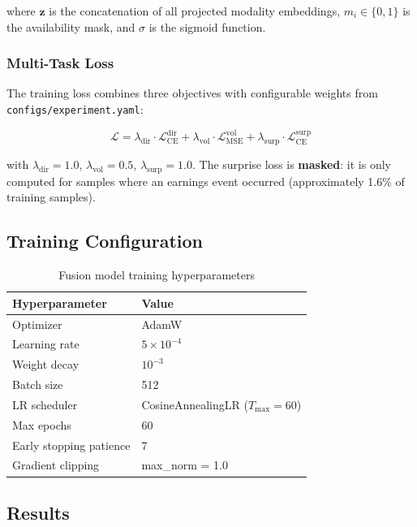 \documentclass[12pt,a4paper]{article}
\begin{document}
where $\mathbf{z}$ is the concatenation of all projected modality embeddings, $m_i \in \{0, 1\}$ is the availability mask, and $\sigma$ is the sigmoid function.

\subsubsection{Multi-Task Loss}

The training loss combines three objectives with configurable weights from \texttt{configs/experiment.yaml}:

\begin{equation}
\mathcal{L} = \lambda_{\text{dir}} \cdot \mathcal{L}_{\text{CE}}^{\text{dir}} + \lambda_{\text{vol}} \cdot \mathcal{L}_{\text{MSE}}^{\text{vol}} + \lambda_{\text{surp}} \cdot \mathcal{L}_{\text{CE}}^{\text{surp}}
\end{equation}

with $\lambda_{\text{dir}} = 1.0$, $\lambda_{\text{vol}} = 0.5$, $\lambda_{\text{surp}} = 1.0$. The surprise loss is \textbf{masked}: it is only computed for samples where an earnings event occurred (approximately 1.6\% of training samples).

\subsection{Training Configuration}

\begin{table}[H]
\centering
\begin{tabular}{ll}
\toprule
\textbf{Hyperparameter} & \textbf{Value} \\
\midrule
Optimizer & AdamW \\
Learning rate & $5 \times 10^{-4}$ \\
Weight decay & $10^{-3}$ \\
Batch size & 512 \\
LR scheduler & CosineAnnealingLR ($T_{\max} = 60$) \\
Max epochs & 60 \\
Early stopping patience & 7 \\
Gradient clipping & max\_norm = 1.0 \\
\bottomrule
\end{tabular}
\caption{Fusion model training hyperparameters}
\label{tab:fusion_hparams}
\end{table}

\subsection{Results}
\end{document}
